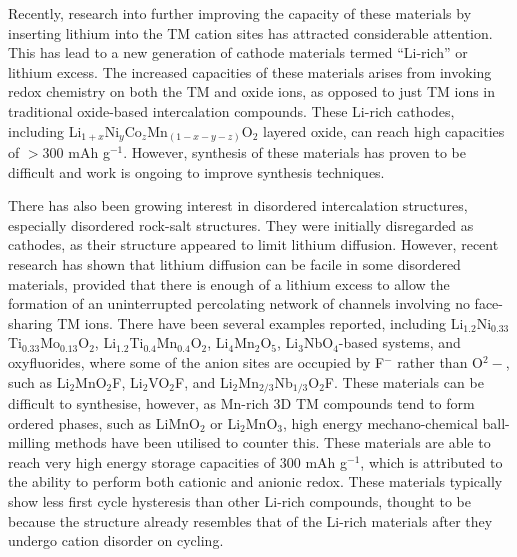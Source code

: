 \documentclass[../main.tex]{subfiles}
\begin{document}
Recently, research into further improving the capacity of these materials by inserting lithium into the TM cation sites has attracted considerable attention. This has lead to a new generation of cathode materials termed ``Li-rich'' or lithium excess. The increased capacities of these materials arises from invoking redox chemistry on both the TM and oxide ions, as opposed to just TM ions in traditional oxide-based intercalation compounds. \cite{Sathiya2013,lee2014unlocking,Oishi2015,Seo2016,Gent2017,Assat2018,naylor2019depth,House2020,House2020a} These Li-rich cathodes, including Li$_{1+x}$Ni$_y$Co$_z$Mn$_{(1-x-y-z)}$O$_2$ layered oxide, can reach high capacities of $>300$ mAh g$^{-1}$. However, synthesis of these materials has proven to be difficult and work is ongoing to improve synthesis techniques.\cite{Hy2016} 

There has also been growing interest in disordered intercalation structures, especially disordered rock-salt structures. They were initially disregarded as cathodes, as their structure appeared to limit lithium diffusion. However, recent research has shown that lithium diffusion can be facile in some disordered materials, provided that there is enough of a lithium excess to allow the formation of an uninterrupted percolating network of channels involving no face-sharing TM ions.\cite{lee2014unlocking,Urban2014,Lee2015} There have been several examples reported, including Li$_{1.2}$Ni$_{0.33}$Ti$_{0.33}$Mo$_{0.13}$O$_2$,\cite{Lee2015} Li$_{1.2}$Ti$_{0.4}$Mn$_{0.4}$O$_2$,\cite{Yabuuchi2016a} Li$_4$Mn$_2$O$_5$,\cite{Freire2016,Yao2018,Bhandari2019454} Li$_3$NbO$_4$-based systems,\cite{Nakajima2017,Yabuuchi2015,Wang2015} and oxyfluorides, where some of the anion sites are occupied by F$^-$ rather than O$^2-$, such as Li$_2$MnO$_2$F,\cite{Sharpe2020,House2018,Lun2020} Li$_2$VO$_2$F,\cite{Chen2015,Chen2015a,Baur2019, Cambaz2019, Baur2020, Kallquist2019, Chang2020} and Li$_2$Mn$_{2/3}$Nb$_{1/3}$O$_2$F.\cite{Lee2018} These materials can be difficult to synthesise, however, as Mn-rich 3D TM compounds tend to form ordered phases, such as LiMnO$_2$ or Li$_2$MnO$_3$, high energy mechano-chemical ball-milling methods have been utilised to counter this.\cite{Freire2016,House2018,Freire2017} These materials are able to reach very high energy storage capacities of $300$ mAh g$^{-1}$,\cite{Jacquet2019} which is attributed to the ability to perform both cationic and anionic redox.\cite{Jacquet2019,clement2020,Chang2020} These materials typically show less first cycle hysteresis than other Li-rich compounds, thought to be because the structure already resembles that of the Li-rich materials after they undergo cation disorder on cycling.
\end{document}
